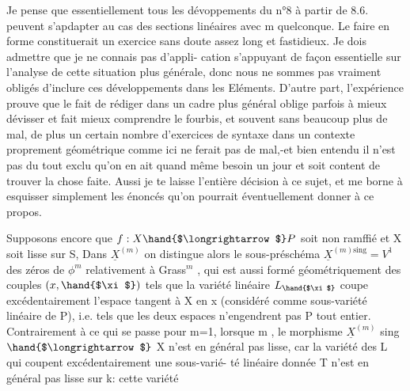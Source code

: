 

Je pense que essentiellement tous les dévoppements du n°8 à
partir de 8.6. peuvent s'apdapter  au cas des sections linéaires avec
m quelconque. Le faire en forme constituerait un exercice sans doute
assez long et fastidieux. Je dois admettre que je ne connais pas d'appli-%
cation s'appuyant de façon essentielle sur l'analyse de cette situation
plus générale, donc nous ne sommes pas vraiment obligés d'inclure ces
développements dans les Eléments. D'autre part, l'expérience prouve que
le fait de rédiger dans un cadre plus général oblige parfois à mieux
dévisser et fait mieux comprendre le fourbis, et souvent sans beaucoup
plus de mal, de plus un certain nombre d'exercices de syntaxe dans un
contexte proprement géométrique comme ici ne ferait pas de mal,-et
bien entendu il n'est pas du tout exclu qu'on en ait quand même besoin
un jour et soit content de trouver la chose faite. Aussi je te laisse
l'entière décision à ce sujet, et me borne à esquisser simplement les
énoncés qu'on pourrait éventuellement donner à ce propos.

Supposons encore que $f:X \hand{$\longrightarrow$} P$ soit non ramffié et X soit lisse sur
S, \hand{(}Dans $\underline{X}^{(m)}$  on distingue alors le sous-préschéma $\underline{X}^{(m)\mathrm{sing}} = V^1$
des zéros  de $\phi^m$ relativement à Grass$^m$ , qui est aussi formé
géométriquement des couples $(x,\hand{$\xi$})$ tels que la variété linéaire $L_{\hand{$\xi$}}$
coupe excédentairement l'espace tangent à X en x (considéré comme
sous-variété linéaire de P), i.e. tels que les deux espaces n'engendrent
pas P tout entier. Contrairement à ce qui se passe pour m=1, lorsque
m , le morphisme $\underline{X}^{(m)}$ sing $\hand{$\longrightarrow$}$ X n'est en général pas
lisse, car la variété des L qui \hand{(}coupent excédentairement une sous-varié-%
té linéaire donnée T n'est en général pas lisse sur k: cette variété

